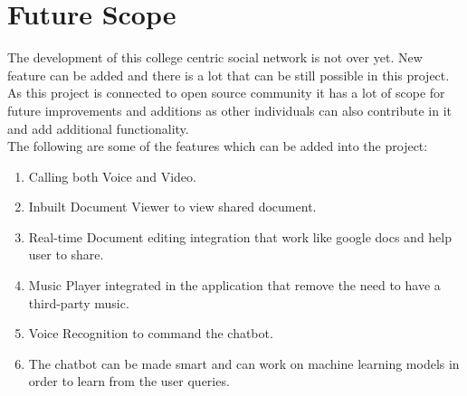 
\section{Future Scope}
The development of this college centric social network is not over yet. New feature can be added and there
is a lot that can be still possible in this project. As this project is connected to open source community it
has a lot of scope for future improvements and additions as other individuals can also contribute in it and
add additional functionality.\\
\noindent The following are some of the features which can be added into the project:

\begin{enumerate}

\item Calling both Voice and Video.

\item Inbuilt Document Viewer to view shared document.

\item Real-time Document editing integration that work like google docs and help user to share.

\item Music Player integrated in the application that remove the need to have a third-party music.

\item Voice Recognition to command the chatbot.
\item The chatbot can be made smart and can work on machine learning models in order to learn from the
user queries.
\end{enumerate}

